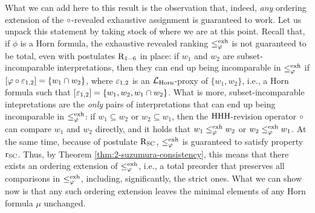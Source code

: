 What we can add here to this result is the observation that, indeed,
\emph{any} ordering extension of the $\circ$-revealed exhaustive assignment
is guaranteed to work.
Let us unpack this statement by taking stock of where we are at this point.
Recall that, if $\phi$ is a Horn formula, 
the exhaustive revealed ranking $\le^{{\operatorname{exh}}}_{\varphi}$ is not guaranteed to be total, 
even with postulates $\mathrm{R}_{1-6}$ in place:
if $w_1$ and $w_2$ are subset-incomparable interpretations, then they can end up being incomparable
in $\le^{{\operatorname{exh}}}_{\varphi}$ if $[\varphi\circ\varepsilon_{1,2}]=\{w_1\cap w_2\}$,
where $\varepsilon_{1,2}$ is an $\mathcal{L}_{\mathrm{Horn}}$-proxy of $\{w_1,w_2\}$,
i.e., a Horn formula such that $[\varepsilon_{1,2}]=\{w_1,w_2,w_1\cap w_2\}$.
What is more, subset-incomparable intepretations are the \emph{only} 
pairs of interpretations that can end up being incomparable in $\le^{{\operatorname{exh}}}_{\varphi}$:
if $w_1\subseteq w_2$ or $w_2\subseteq w_1$, then 
the ${\mathrm{HHH}}$-revision operator $\circ$ can compare $w_1$ and $w_2$ directly,
and it holds that $w_1 \le^{{\operatorname{exh}}}_{\varphi}w_2$ or $w_2 \le^{{\operatorname{exh}}}_{\varphi}w_1$.
At the same time, because of postulate $\mathrm{R}_{{\mathrm{SC}}}$, $\le^{{\operatorname{exh}}}_{\varphi}$ 
is guaranteed to satisfy property $\mathrm{r}_{{\mathrm{SC}}}$.
Thus, by Theorem \ref{thm:2-suzumura-consistency}, 
this means that there exists an ordering extension
of $\le^{{\operatorname{exh}}}_{\varphi}$, 
i.e., a total preorder that preserves all comparisons in $\le^{{\operatorname{exh}}}_{\varphi}$,
including, significantly, the strict ones.
What we can show now is that any such ordering extension 
leaves the minimal elements of any Horn formula $\mu$ unchanged.

